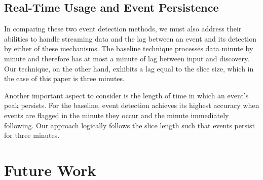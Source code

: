 \documentclass{acm_proc_article-sp}
\begin{document}
\subsection{Real-Time Usage and Event Persistence}

In comparing these two event detection methods, we must also address their abilities to handle streaming data and the lag between an event and its detection by either of these mechanisms.
The baseline technique processes data minute by minute and therefore has at most a minute of lag between input and discovery.
Our technique, on the other hand, exhibits a lag equal to the slice size, which in the case of this paper is three minutes.

Another important aspect to consider is the length of time in which an event's peak persists.
For the baseline, event detection achieves its highest accuracy when events are flagged in the minute they occur and the minute immediately following.
Our approach logically follows the slice length such that events persist for three minutes.

\section{Future Work}
\label{sect:future}
\end{document}
